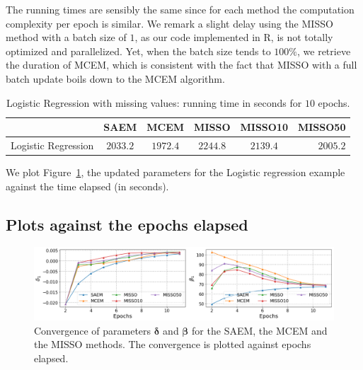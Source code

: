 \documentclass[final,12pt]{alt2022} %
\begin{document}
The running times are sensibly the same since for each method the computation complexity per epoch is similar.
We remark a slight delay using the MISSO method with a batch size of $1$, as our code implemented in R, is not totally optimized and parallelized.
Yet, when the batch size tends to $100\%$, we retrieve the duration of MCEM, which is consistent with the fact that MISSO with a full batch update boils down to the MCEM algorithm.


\begin{table}[H]
\begin{center}
\begin{tabular}{ l c c c c r}
  \hline
& {SAEM} & {MCEM} & {MISSO} & {MISSO10} & {MISSO50} \\ 
  \hline

{Logistic Regression}  & {$2033.2$} & {$1972.4$} & {$2244.8$} & {$2139.4$} & {$2005.2$}  \\ 
  \hline
\end{tabular}
\caption{Logistic Regression with missing values: running time in seconds for $10$ epochs.}    \label{tab:tablelogisitc}
\end{center}
\end{table}


We plot Figure~\ref{fig:misso_trauma_wallclock}, the updated parameters for the Logistic regression example against the time elapsed (in seconds).


\subsection{Plots against the epochs elapsed}


\begin{figure}[H]
\includegraphics[width=\textwidth]{figure/traumabasenoexp.png}\vspace{-.2cm}
\caption{Convergence of parameters ${\bm \delta}$ and ${\bm \beta}$ for the SAEM, the MCEM and the MISSO methods. The convergence is plotted against epochs elapsed.}\vspace{-.2cm}
\label{fig:misso_trauma_wallclock}
\end{figure}
\end{document}

